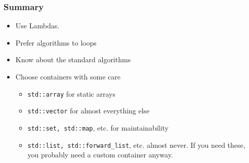 
\begin{frame}[fragile,t]
\frametitle{Summary}

\begin{itemize}[<+->]
\item Use Lambdas.
\item Prefer algorithms to loops
\item Know about the standard algorithms
\item Choose containers with some care
  \begin{itemize}
    \item \texttt{std::array} for static arrays
    \item \texttt{std::vector} for almost everything else
    \item \texttt{std::set, std::map}, etc. for maintainability
    \item \texttt{std::list, std::forward\_list}, etc. almost never.
      If you need these, you probably need a custom container anyway.
  \end{itemize}
\end{itemize}
\end{frame}


